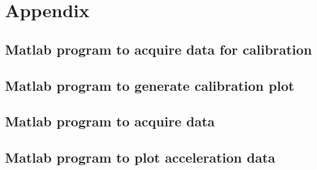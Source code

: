 \documentclass{article} %
\begin{document}
\clearpage
\section{Appendix}
%

\subsection{Matlab program to acquire data for calibration}
\label{app:calibCode}


\clearpage
\subsection{Matlab program to generate calibration plot}
\label{app:genCalib}


\clearpage
\subsection{Matlab program to acquire data}
\label{app:acqCode}


\clearpage
\subsection{Matlab program to plot acceleration data}
\label{app:plotAccData}

\end{document}
